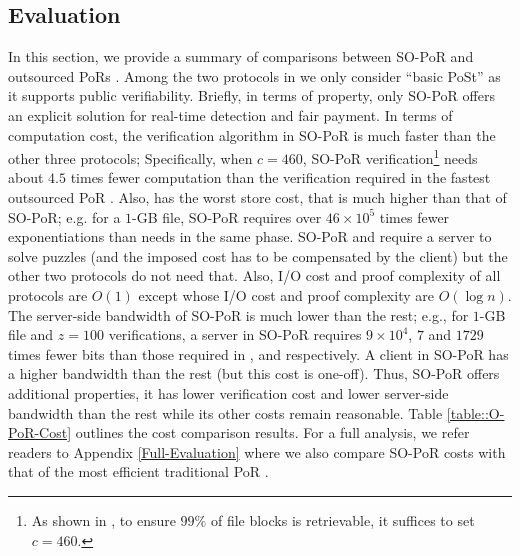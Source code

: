 \vspace{-5mm}

\subsection{Evaluation}

In this section, we provide a summary of comparisons between   SO-PoR and outsourced PoRs  \cite{armknecht2014outsourced,xu2016lightweight,Storage-Time}. Among the two protocols  in \cite{Storage-Time} we only consider ``basic PoSt'' as it supports public verifiability. Briefly, in terms of property, only SO-PoR offers an explicit solution for real-time detection and fair payment. In terms of computation cost, the verification algorithm in SO-PoR is much faster than the other three protocols; Specifically, when $c=460$,  SO-PoR verification\footnote{As shown in \cite{DBLP:conf/ccs/AtenieseBCHKPS07}, to ensure $99\%$ of file blocks is retrievable, it  suffices to set $c=460$.} needs about $4.5$ times fewer computation than the verification required in the fastest outsourced PoR \cite{armknecht2014outsourced}.   Also, \cite{armknecht2014outsourced} has the worst store cost, that is  much higher than that of SO-PoR; e.g. for a $1$-GB file, SO-PoR requires over $46 \times 10^{\scriptscriptstyle 5}$ times fewer exponentiations than \cite{armknecht2014outsourced} needs in the same phase.  SO-PoR and \cite{Storage-Time} require a server to solve puzzles (and the imposed cost has to be compensated by the client) but the other two protocols do not need that. Also,  I/O cost and proof complexity of all protocols are $O(1)$ except \cite{Storage-Time} whose I/O cost and proof complexity are $O(\log n)$. The server-side bandwidth of SO-PoR is much lower than the rest;  e.g., for $1$-GB file and $z=100$ verifications, a server in SO-PoR requires $9\times 10^{\scriptscriptstyle4}$,  $7$ and $1729$ times fewer bits  than those required in \cite{armknecht2014outsourced}, \cite{xu2016lightweight} and \cite{Storage-Time} respectively.  A client in SO-PoR has a higher bandwidth than the rest (but this cost is one-off). Thus, SO-PoR offers additional properties, it has lower verification cost and lower server-side bandwidth than the rest while its other costs remain reasonable. Table \ref{table::O-PoR-Cost} outlines the cost comparison results. For a  full analysis, we refer readers to Appendix \ref{Full-Evaluation} where  we also compare SO-PoR costs with that of the most efficient  traditional PoR  \cite{DBLP:conf/asiacrypt/ShachamW08}.


